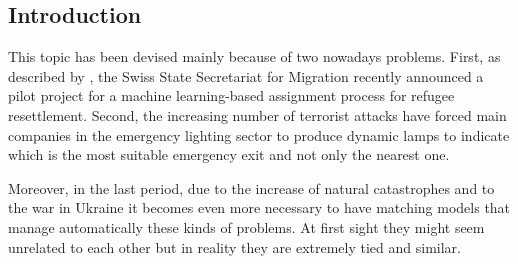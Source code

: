 \subsection{Introduction}\label{introduction}
\citet{basshuysen,delacretaz_2020,andersson_2018,andersson_2016}
This topic has been devised mainly because of two nowadays problems. First, as described by \citet{olbergml}, the Swiss State Secretariat for Migration recently announced a pilot project for a machine learning-based assignment process for refugee resettlement. Second, the increasing number of terrorist attacks have forced main companies in the emergency lighting sector to produce dynamic lamps to indicate which is the most suitable emergency exit and not only the nearest one.

Moreover, in the last period, due to the increase of natural catastrophes and to the war in Ukraine it becomes even more necessary to have matching models that manage automatically  these kinds of problems. At first sight they might seem unrelated to each other but in reality they are extremely tied and similar.
